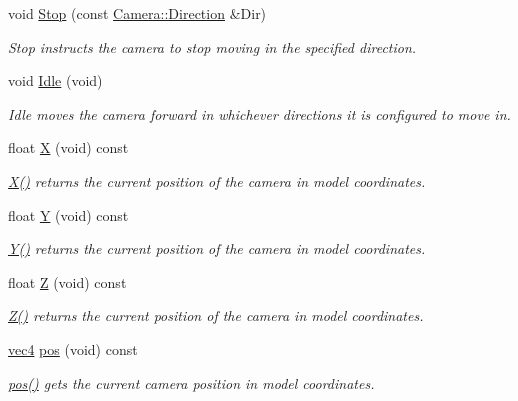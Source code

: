 \begin{DoxyCompactItemize}
void \hyperlink{class_camera_adf064f765f610684e0675bd67de013fd}{\-Stop} (const \hyperlink{class_camera_a80cb65605322d27ad3b6d973484509ec}{\-Camera\-::\-Direction} \&\-Dir)
\begin{DoxyCompactList}\small\item\em \-Stop instructs the camera to stop moving in the specified direction. \end{DoxyCompactList}\item 
void \hyperlink{class_camera_aec3559fe43597656629fdb00157d3c73}{\-Idle} (void)
\begin{DoxyCompactList}\small\item\em \-Idle moves the camera forward in whichever directions it is configured to move in. \end{DoxyCompactList}\item 
float \hyperlink{class_camera_a2f7fd64d5d6e0dfb5edcca53c7d15994}{\-X} (void) const 
\begin{DoxyCompactList}\small\item\em \hyperlink{class_camera_a2f7fd64d5d6e0dfb5edcca53c7d15994}{\-X()} returns the current position of the camera in model coordinates. \end{DoxyCompactList}\item 
float \hyperlink{class_camera_a37529ef93871f547ebfd5862bc6cce62}{\-Y} (void) const 
\begin{DoxyCompactList}\small\item\em \hyperlink{class_camera_a37529ef93871f547ebfd5862bc6cce62}{\-Y()} returns the current position of the camera in model coordinates. \end{DoxyCompactList}\item 
float \hyperlink{class_camera_abf1730e47e8e51c76acbddcaa85e2475}{\-Z} (void) const 
\begin{DoxyCompactList}\small\item\em \hyperlink{class_camera_abf1730e47e8e51c76acbddcaa85e2475}{\-Z()} returns the current position of the camera in model coordinates. \end{DoxyCompactList}\item 
\hyperlink{struct_angel_1_1vec4}{vec4} \hyperlink{class_camera_a9982ac5f48fe0af97fefa725080d6da6}{pos} (void) const 
\begin{DoxyCompactList}\small\item\em \hyperlink{class_camera_a9982ac5f48fe0af97fefa725080d6da6}{pos()} gets the current camera position in model coordinates. \end{DoxyCompactList}\item 

\end{DoxyCompactItemize}
